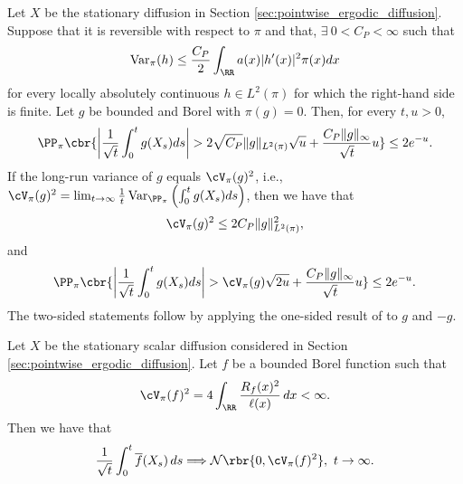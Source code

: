 \documentclass[11pt]{article}
\begin{document}
\begin{lemma}
\label{lem:tool_gao_bernstein}
Let $X$ be the stationary diffusion in
Section \ref{sec:pointwise_ergodic_diffusion}. Suppose that it is reversible
with respect to $\pi$ and that,  $\exists\ 0<C_P<\infty$ such that
\begin{align}
\operatorname{Var}_\pi(h)
\le
\frac{C_P}{2}
\int_{\RR}a(x)|h'(x)|^2\pi(x)dx
\label{eq:tool_gao_poincare}
\end{align}
for every locally absolutely continuous $h\in L^2(\pi)$ for which the
right-hand side is finite. Let $g$ be bounded and Borel with $\pi(g)=0$.
Then, for every $t,u>0$,
\begin{align}
\PP_\pi\cbr{
\left|
\frac1{\sqrt t}\int_0^t g(X_s)ds
\right|
>
2\sqrt{C_P}\|g\|_{L^2(\pi)}\sqrt u
+
\frac{C_P\|g\|_\infty}{\sqrt t}u
}
\le2e^{-u}.
\label{eq:tool_gao_coarse_two_sided}
\end{align}
If the long-run variance of $g$ equals $\cV_\pi(g)^2$, i.e., 
$\cV_\pi(g)^2
=
\lim_{t\to\infty}
\frac1t
\operatorname{Var}_{\PP_\pi}
\left(
\int_0^t g(X_s)ds
\right)$, then we have that
\begin{align}
\cV_\pi(g)^2
\le
2C_P\|g\|_{L^2(\pi)}^2,
\label{eq:tool_gao_variance_domination}
\end{align}
and
\begin{align}
\PP_\pi\cbr{
\left|
\frac1{\sqrt t}\int_0^t g(X_s)ds
\right|
>
\cV_\pi(g)\sqrt{2u}
+
\frac{C_P\|g\|_\infty}{\sqrt t}u
}
\le2e^{-u}.
\label{eq:tool_gao_two_sided}
\end{align}
The two-sided statements follow by applying the one-sided result of
\citet{gao2014bernstein} to $g$ and $-g$.
\end{lemma}
\begin{lemma}
\label{lem:tool_vdvz_scalar_clt}
Let $X$ be the stationary scalar diffusion considered in
Section \ref{sec:pointwise_ergodic_diffusion}. Let $f$ be a bounded
Borel function such that
\begin{align*}
\cV_\pi(f)^2
=
4\int_{\RR}\frac{R_f(x)^2}{\ell(x)}\,dx
<\infty.
\end{align*}
Then we have that
\begin{align*}
\frac{1}{\sqrt t}
\int_0^t\overline f(X_s)\,ds
\Longrightarrow
\mathcal N\rbr{0,\cV_\pi(f)^2},
\ t\to\infty.
\end{align*}
\end{lemma}
\end{document}
